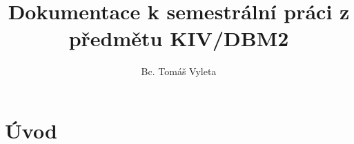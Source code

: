 \documentclass[a4, titlepage]{article}
\begin{document}
\title{Dokumentace k semestrální práci z předmětu KIV/DBM2}
\author{Bc. Tomáš Vyleta}
\date{}

\maketitle

\tableofcontents

\section*{Úvod}
\end{document}
